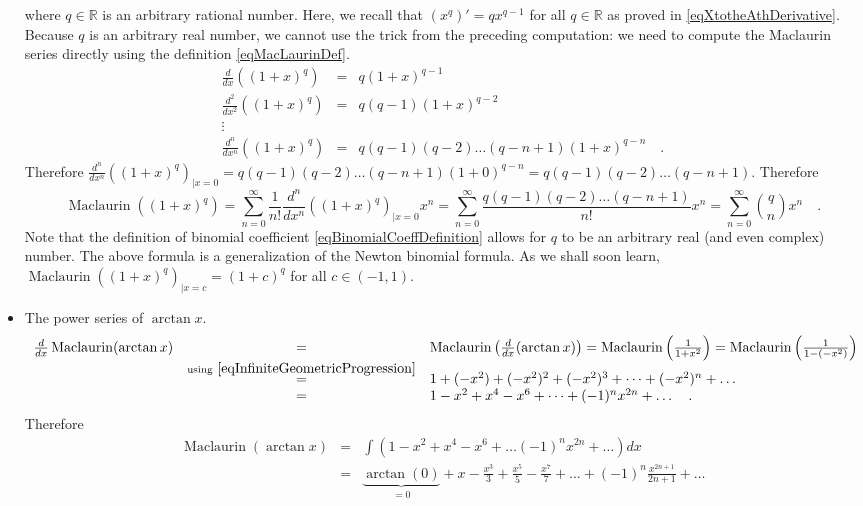 \documentclass[12pt]{book}
\DeclareMathOperator{\maclaurin}{Maclaurin}
\begin{document}
\begin{itemize}
\[\]
where $q\in \mathbb R$ is an arbitrary rational number. Here, we recall that $(x^q)'=qx^{q-1}$ for all $q\in \mathbb R$ as proved in \eqref{eqXtotheAthDerivative}. Because $q$ is an arbitrary real number, we cannot use the trick from the preceding computation: we need to compute the Maclaurin series directly using the definition \eqref{eqMacLaurinDef}. 
\[
\begin{array}{rcl}
\frac{d}{dx}\left( (1+x)^q\right)&=& q (1+x)^{q-1}\\
\frac{d^{2}}{dx^2}\left( (1+x)^q\right)&=& q(q-1) (1+x)^{q-2}\\
\vdots \\
\frac{d^{n}}{dx^n}\left( (1+x)^q\right)&=& q(q-1)(q-2)\dots (q-n+1) (1+x)^{q-n}\quad .
\end{array}
\]
Therefore $\frac{d^{n}}{dx^n}\left( (1+x)^q\right)_{|x=0}=q(q-1)(q-2)\dots (q-n+1) (1+0)^{q-n}= q(q-1)(q-2)\dots (q-n+1)  $. Therefore 
\begin{equation}\label{eqNewtonBinomialGeneralized}
\maclaurin \left( (1+x)^q\right)=\sum_{n=0}^{\infty}\frac{1}{n!}\frac{d^n}{dx^n}\left((1+x)^q\right)_{|x=0} x^n  =\sum_{n=0}^{\infty}  \frac{q(q-1)(q-2)\dots (q-n+1)}{n!}x^n= \sum_{n=0}^{\infty} \binom{q}{n}x^n\quad . 
\end{equation}
Note that the definition of binomial coefficient \eqref{eqBinomialCoeffDefinition} allows for $q$ to be an arbitrary real (and even complex) number. The above formula is a generalization of the Newton binomial formula.  As we shall soon learn, $\maclaurin \left( (1+x)^q\right)_{|x=c} =(1+c)^q $   for all $c\in (-1, 1)$.
\item The power series of $\arctan x$.
\[
\begin{array}{rcl}
\frac{d}{dx}\maclaurin (\arctan x)&=& \maclaurin\left( \frac{d}{dx}(\arctan x)\right)= \maclaurin \left(\frac{1}{1+x^2}\right)  = \maclaurin \left(\frac{1}{1-(-x^2)}\right)\\
& \stackrel{\mathrm{using~} \eqref{eqInfiniteGeometricProgression} }{=} & 1+(-x^2)+(-x^2)^2+(-x^2)^3+\dots+ (-x^2)^n+\dots
\\ &=& 1-x^2+x^4-x^6+\dots+ (-1)^nx^{2n}+\dots \quad .
\end{array}
\]
Therefore 
\[
\begin{array}{rcl}
\maclaurin (\arctan x)&=&\displaystyle \int( 1-x^2+x^4-x^6+\dots (-1)^nx^{2n}+\dots )dx \\
&=& \underbrace{\arctan(0)}_{=0}+ x-\frac{x^3}3+\frac{x^5}5-\frac{x^7}7+\dots +(-1)^n\frac{x^{2n+1}}{2n+1}+\dots\\

\end{array}\]
\end{itemize}
\end{document}
